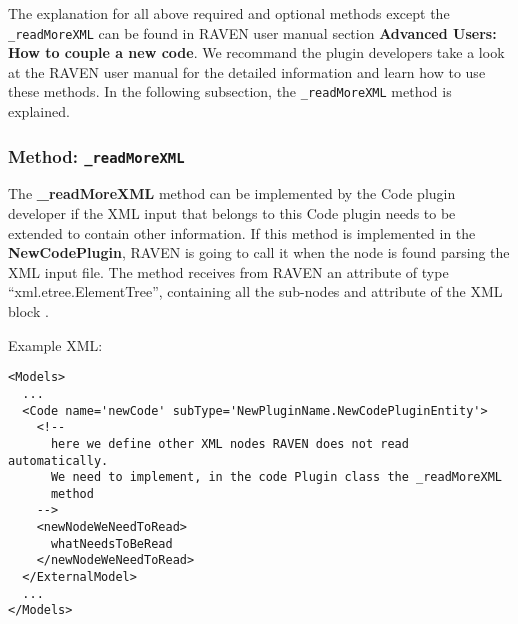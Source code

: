 The explanation for all above required and optional methods except the \texttt{\_readMoreXML} can be found in
RAVEN user manual section \textbf{Advanced Users: How to couple a new code}. We recommand the plugin developers
take a look at the RAVEN user manual for the detailed information and learn how to use these methods. In the
following subsection, the \texttt{\_readMoreXML} method is explained.

\subsubsection{Method: \texttt{\_readMoreXML}}
\label{subsubsec:codePluginReadMoreXML}
The \textbf{\_readMoreXML} method can be implemented by the
Code plugin developer if the XML input that belongs to this Code
plugin needs to be extended to contain other information.
%
If this method is implemented in the \textbf{NewCodePlugin}, RAVEN is going to
call it when the node  is found parsing the XML input
file.
%
The method receives from RAVEN an attribute of type ``xml.etree.ElementTree'',
containing all the sub-nodes and attribute of the XML block .
%

Example XML:
\begin{lstlisting}[style=XML,morekeywords={subType,ModuleToLoad}]
<Models>
  ...
  <Code name='newCode' subType='NewPluginName.NewCodePluginEntity'>
    <!--
      here we define other XML nodes RAVEN does not read automatically.
      We need to implement, in the code Plugin class the _readMoreXML
      method
    -->
    <newNodeWeNeedToRead>
      whatNeedsToBeRead
    </newNodeWeNeedToRead>
  </ExternalModel>
  ...
</Models>
\end{lstlisting}
